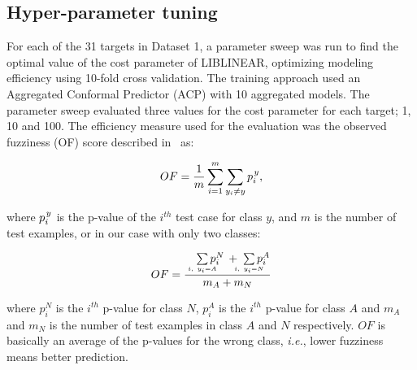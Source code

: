 \documentclass[utf8]{frontiersSCNS} %
\begin{document}
\subsection{Hyper-parameter tuning}
For each of the 31 targets in Dataset 1, a parameter sweep was run to find the optimal value
of the cost parameter of LIBLINEAR, optimizing modeling efficiency using
10-fold cross validation. The training approach used an Aggregated Conformal
Predictor (ACP) with 10 aggregated models.  The parameter sweep evaluated three
values for the cost parameter for each target; 1, 10 and 100. The efficiency
measure used for the evaluation was the observed fuzziness (OF) score described
in~\cite{Vovk2016} as:

\begin{equation}
OF =\frac{ 1}{m} \sum\limits_{i=1}^{m} \sum\limits_{y_i \neq y }  p_i^{\kern1pt y},		
\end{equation}

where $p_i^{\kern1pt y}$ is the p-value of the $i^{th}$ test case for class $y$, and $m$ is the number of test examples, or in our case with only two classes:

\begin{equation}
OF =  \frac
        {\quad\sum\limits_{\mathclap{\substack{\scriptscriptstyle i,\ y_i=A}}}p_i^N \, + \;\sum\limits_{\mathclap{\substack{\scriptscriptstyle i,\ y_i=N}}}p_i^A}
        {m_A + m_N}
\end{equation}

where $p_i^N$ is the $i^{th}$ p-value for class $N$, $p_i^A$ is the $i^{th}$
p-value for class $A$ and $m_A$ and $m_N$ is the number of test examples in
class $A$ and $N$ respectively. $OF$ is basically an average of the p-values for
the wrong class, \textit{i.e.}, lower fuzziness means better prediction.
\end{document}
